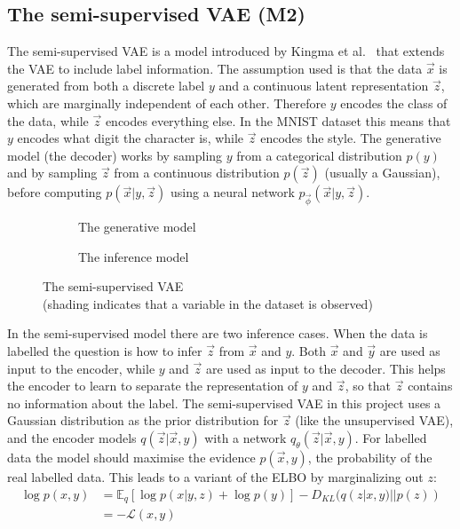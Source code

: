 \subsection{The semi-supervised VAE (M2)} \label{ssVAE}

The semi-supervised VAE is a model introduced by Kingma et al.~\cite{DBLP:journals/corr/KingmaRMW14} that extends the VAE to include label information. 
The assumption used is that the data $\vec{x}$ is generated from both a discrete label $y$ and a continuous latent representation 
$\vec{z}$, which are marginally independent of each other.
Therefore $y$ encodes the class of the data, while $\vec{z}$ encodes everything else. In the MNIST dataset this means that $y$ encodes
what digit the character is, while $\vec{z}$ encodes the style. The generative model (the decoder) works by sampling $y$ from a 
categorical distribution $p(y)$ and by sampling $\vec{z}$ from a continuous distribution $p(\vec{z})$ (usually a Gaussian), before computing 
$p(\vec{x}|y, \vec{z})$ using a neural network $p_{\vec{\phi}}(\vec{x}|y, \vec{z})$.
\begin{figure}[H]
  \begin{subfigure}[b]{0.5\textwidth}
    \centering
    \scalebox{.9}{}
    \caption{The generative model}
  \end{subfigure}
  \begin{subfigure}[b]{0.5\textwidth}
    \centering
    \scalebox{.9}{}
    \caption{The inference model}
  \end{subfigure}
  \caption[Semi-supervised VAE]{The semi-supervised VAE \\ (shading indicates that a variable in the dataset is observed)}
  \label{fig:ss_vae}
\end{figure}

In the semi-supervised model there are two inference cases. When the data is labelled the question is how to infer $\vec{z}$ from $\vec{x}$ and $y$.
Both $\vec{x}$ and $\vec{y}$ are used as input to the encoder, while $y$ and $\vec{z}$ are used as input to the decoder.
This helps the encoder to learn to separate the representation of $y$ and $\vec{z}$, so that $\vec{z}$ contains
no information about the label. The semi-supervised VAE in this project uses a Gaussian distribution as the prior distribution for 
$\vec{z}$ (like the unsupervised VAE), and the encoder models $q(\vec{z}|\vec{x}, y)$ with a network $q_{\theta}(\vec{z}|\vec{x}, y)$. For labelled data 
the model should 
maximise the evidence $p(\vec{x}, y)$, the probability of the real labelled data. This leads to a variant of the ELBO by marginalizing
out $z$:
\begin{align}
  \log p(x, y) & = \mathbb{E}_q [\log p(x|y, z) + \log p(y)] - D_{KL}(q(z|x, y)||p(z)) \\
  & = -\mathcal{L}(x, y)
\end{align}

